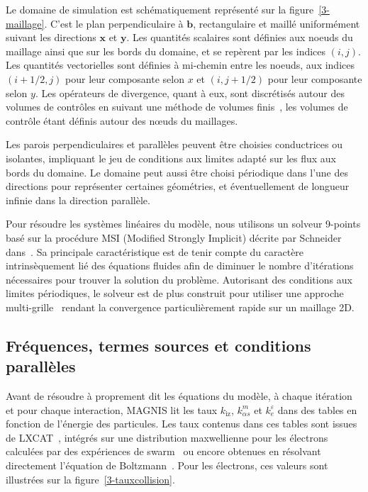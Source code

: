 \begin{refsection}
Le domaine de simulation est schématiquement représenté sur la figure~\ref{3-maillage}.
C'est le plan perpendiculaire à $\mathbf{b}$, rectangulaire et maillé uniformément suivant
les directions $\mathbf{x}$ et $\mathbf{y}$. Les quantités
scalaires sont définies aux noeuds du maillage ainsi que sur les bords du
domaine, et se repèrent par les indices $(i,j)$. Les quantités vectorielles
sont définies à mi-chemin entre les noeuds, aux indices $(i+1/2,j)$ pour leur
composante selon $x$ et $(i,j+1/2)$ pour leur composante selon $y$.
Les opérateurs
de divergence, quant à eux, sont discrétisés autour des volumes de contrôles en
suivant une méthode de volumes finis~\parencite{toro}, les volumes de
contrôle étant définis autour des n\oe uds du maillages. 

Les parois perpendiculaires et parallèles peuvent être choisies conductrices ou
isolantes, impliquant le jeu de conditions aux limites adapté sur les flux
aux bords du domaine. Le domaine peut aussi être choisi périodique dans l'une
des directions pour représenter certaines géométries, et éventuellement
de longueur infinie dans la direction parallèle.
 
Pour résoudre les systèmes linéaires du modèle, nous utilisons un solveur
9-points basé sur la procédure
MSI (Modified Strongly Implicit) décrite par Schneider
dans~\parencite{Schneider}. Sa principale caractéristique est de tenir
compte du caractère intrinsèquement lié des équations fluides afin de diminuer
le nombre d'itérations nécessaires pour trouver la solution du problème. Autorisant des
conditions aux limites périodiques, le solveur est de plus construit pour
utiliser une approche multi-grille~\parencite{Fedorenko} rendant la convergence
particulièrement rapide sur un maillage 2D.

\subsection{Fréquences, termes sources et conditions parallèles}
Avant de résoudre à proprement dit les équations du modèle, à chaque
itération et pour chaque interaction, MAGNIS lit les taux $k_\text{iz}$,
$k^m_{\alpha s}$ et $k^\varepsilon_{e}$ dans des tables en fonction
de l'énergie des particules. 
Les taux contenus dans ces tables
sont issues de LXCAT~\parencite{LXCAT}, intégrés sur une distribution
maxwellienne pour les électrons calculées par des expériences de
swarm~\parencite{Phelps} ou encore obtenues en résolvant directement l'équation
de Boltzmann~\parencite{Bolsig}. Pour les électrons, ces valeurs sont
illustrées sur la figure~\ref{3-tauxcollision}.


\end{refsection}
